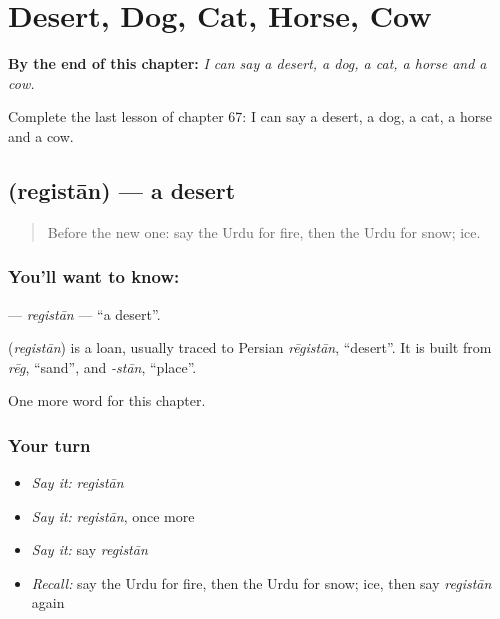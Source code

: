 
\chapter{Desert, Dog, Cat, Horse, Cow}
\label{ch:ur-desert-dog-cat-horse-cow}

\begin{chapteropening}
\textbf{By the end of this chapter:} \emph{I can say a desert, a dog, a cat, a horse and a cow.}

Complete the last lesson of chapter 67: I can say a desert, a dog, a cat, a horse and a cow.
\end{chapteropening}

\section[\texorpdfstring{\ur{ریگستان} (registān)}{ریگستان (registān)}]{ (registān) — a desert}

\label{lesson:UR-C67-registan}



\begin{quote}
Before the new one: say the Urdu for fire, then the Urdu for snow; ice.
\end{quote}

\subsection*{You'll want to know: }
\textbf{} — \emph{registān} — \textquotedblleft{}a desert\textquotedblright{}.

\begin{cousinweb}
\textbf{} (\emph{registān}) is a loan, usually traced to Persian \emph{rēgistān}, \textquotedblleft{}desert\textquotedblright{}. It is built from \emph{rēg}, \textquotedblleft{}sand\textquotedblright{}, and \emph{-stān}, \textquotedblleft{}place\textquotedblright{}.
\end{cousinweb}

\begin{grammarlens}[title={What you've built}]
One more word for this chapter.
\end{grammarlens}

\subsection*{Your turn}
\begin{itemize}
\raggedright
  \item \emph{Say it:} \emph{registān}
  \item \emph{Say it:} \emph{registān}, once more
  \item \emph{Say it:} say \emph{registān}
  \item \emph{Recall:} say the Urdu for fire, then the Urdu for snow; ice, then say \emph{registān} again
\end{itemize}

